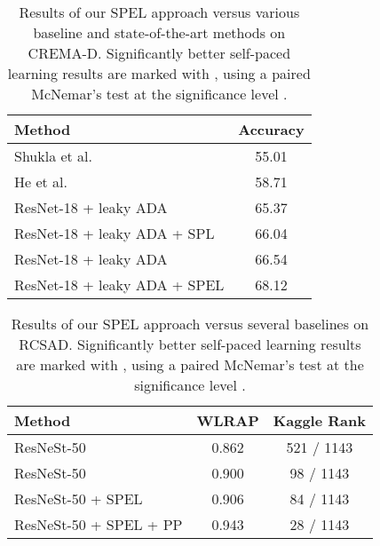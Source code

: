 \documentclass[a4paper]{article}
\begin{document}
\begin{table}[!t]
\caption{Results of our SPEL approach versus various baseline and state-of-the-art methods on CREMA-D. Significantly better self-paced learning results are marked with , using a paired McNemar's test \cite{Dietterich-NC-1998} at the significance level .}
\label{tab_results_cremad}
\vspace{-0.2cm}
\centering
\begin{tabular}{l c}
\toprule
{\textbf{Method}} & {\textbf{Accuracy}}\\
\midrule
Shukla et al.~\cite{Shukla-ICASSP-2020} & 55.01 \\
He et al.~\cite{He-CVPRW-2020} & 58.71 \\
\midrule
ResNet-18 + leaky ADA \cite{georgescu2020non}          & 65.37 \\
ResNet-18 + leaky ADA \cite{georgescu2020non} + SPL          & 66.04 \\
\midrule
ResNet-18 + leaky ADA \cite{georgescu2020non}          & 66.54 \\
ResNet-18 + leaky ADA \cite{georgescu2020non} + SPEL   & 68.12 \\
\bottomrule
\end{tabular}
\vspace{-0.1cm}
\end{table}

\begin{table}[!t]
\caption{Results of our SPEL approach versus several baselines on RCSAD. Significantly better self-paced learning results are marked with , using a paired McNemar's test \cite{Dietterich-NC-1998} at the significance level .}
\label{tab_results_rcsad}
\centering
\vspace{-0.2cm}
\begin{tabular}{l c c}
\toprule
\textbf{Method} & \textbf{WLRAP} & \textbf{Kaggle Rank}\\
\midrule
ResNeSt-50                              & 0.862 & 521 / 1143\\
\midrule
ResNeSt-50                     & 0.900 & 98 / 1143\\
ResNeSt-50 + SPEL               & {0.906} & 84 / 1143\\
ResNeSt-50 + SPEL + PP          & {0.943} & 28 / 1143\\
\bottomrule
\end{tabular}
\vspace{-0.4cm}
\end{table}

\vspace{-0.cm}
\end{document}
